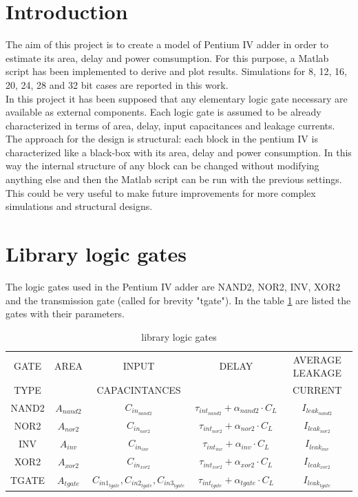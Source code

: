 

\section{Introduction}
The aim of this project is to create a model of Pentium IV adder in order to estimate its area, delay and power comsumption. For this purpose, a Matlab script has been implemented to derive and plot results. Simulations for 8, 12, 16, 20, 24, 28 and 32 bit cases are reported in this work.\\
In this project it has been supposed that any elementary logic gate necessary are available as external components. Each logic gate is assumed to be already characterized in terms of area, delay, input capacitances and leakage currents.\\
The approach for the design is structural: each block in the pentium IV is characterized like a black-box with its area, delay and power consumption. In this way the internal structure of any block can be changed without modifying anything else and then the Matlab script can be run with the previous settings. This could be very useful to make future improvements for more complex simulations and structural designs.\\



\section{Library logic gates}
The logic gates used in the Pentium IV adder are NAND2, NOR2, INV, XOR2 and the transmission gate (called for brevity "tgate"). In the table  \ref{library_logic_gates} are listed the gates with their parameters.

\begin{table}[H]
\begin{center}
\begin{tabular}{|c|c|c|c|c|}
\hline
GATE & AREA & INPUT & DELAY & AVERAGE LEAKAGE \\
TYPE &      & CAPACINTANCES &  & CURRENT \\ \hline
NAND2 & $A_{nand2}$ & $C_{in_{nand2}}$ & $\tau_{int_{nand2}}+\alpha_{nand2}\cdot C_L$ & $I_{leak_{nand2}}$ \\ \hline
NOR2 & $A_{nor2}$ & $C_{in_{nor2}}$ & $\tau_{int_{nor2}}+\alpha_{nor2}\cdot C_L$ & $I_{leak_{nor2}}$ \\ \hline
INV & $A_{inv}$ & $C_{in_{inv}}$ & $\tau_{int_{inv}}+\alpha_{inv}\cdot C_L$ & $I_{leak_{inv}}$ \\ \hline
XOR2 & $A_{xor2}$ & $C_{in_{xor2}}$ & $\tau_{int_{xor2}}+\alpha_{xor2}\cdot C_L$ & $I_{leak_{xor2}}$ \\ \hline
TGATE & $A_{tgate}$ & $C_{in1_{tgate}}, C_{in2_{tgate}}, C_{in3_{tgate}}$ & $\tau_{int_{tgate}}+\alpha_{tgate}\cdot C_L$ & $I_{leak_{tgate}}$ \\ \hline
\end{tabular}
\end{center}
\caption{library logic gates}
\label{library_logic_gates}
\end{table}

